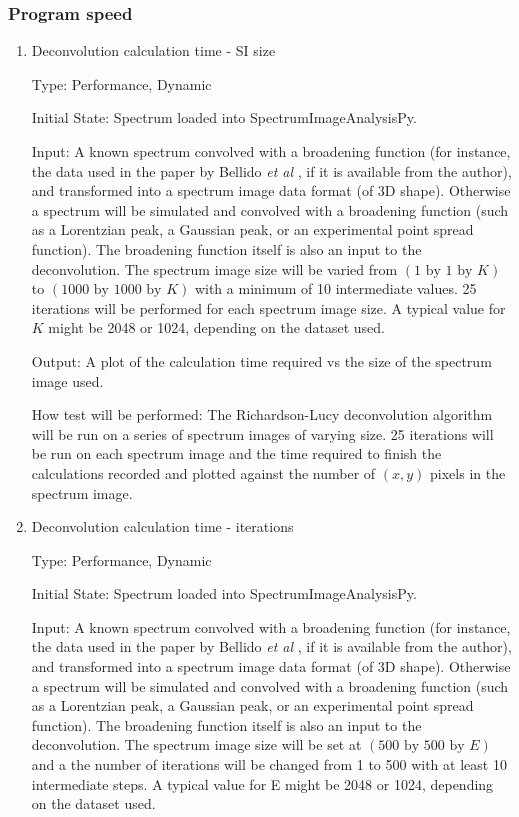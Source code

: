 \documentclass[12pt, titlepage]{article}
\newcommand{\progname}{SpectrumImageAnalysisPy}
\begin{document}
\subsubsection{Program speed}

\begin{enumerate}

\paragraph{Deconvolution}
\item{Deconvolution calculation time - SI size}

Type: Performance, Dynamic
					
Initial State: Spectrum loaded into \progname{}.

Input: A known spectrum convolved with a broadening function (for instance, the data used in the paper by Bellido \textit{et al} \cite{bellido_toward_2014}, if it is available from the author), and transformed into a spectrum image data format (of 3D shape). Otherwise a spectrum will be simulated and convolved with a broadening function (such as a Lorentzian peak, a Gaussian peak, or an experimental point spread function). The broadening function itself is also an input to the deconvolution. The spectrum image size will be varied from $(1\text{ by }1\text{ by }K)$ to $(1000 \text{ by } 1000 \text{ by } K)$ with a minimum of 10 intermediate values. 25 iterations will be performed for each spectrum image size. A typical value for $K$ might be 2048 or 1024, depending on the dataset used.

Output: A plot of the calculation time required vs the size of the spectrum image used.

How test will be performed: The Richardson-Lucy deconvolution algorithm will be run on a series of spectrum images of varying size. 25 iterations will be run on each spectrum image and the time required to finish the calculations recorded and plotted against the number of $(x, y)$ pixels in the spectrum image.\\


\item{Deconvolution calculation time - iterations}

Type: Performance, Dynamic
					
Initial State: Spectrum loaded into \progname{}.

Input: A known spectrum convolved with a broadening function (for instance, the data used in the paper by Bellido \textit{et al} \cite{bellido_toward_2014}, if it is available from the author), and transformed into a spectrum image data format (of 3D shape). Otherwise a spectrum will be simulated and convolved with a broadening function (such as a Lorentzian peak, a Gaussian peak, or an experimental point spread function). The broadening function itself is also an input to the deconvolution. The spectrum image size will be set at $(500 \text{ by } 500 \text{ by } E)$ and a the number of iterations will be changed from 1 to 500 with at least 10 intermediate steps. A typical value for E might be 2048 or 1024, depending on the dataset used.


\end{enumerate}
\end{document}
